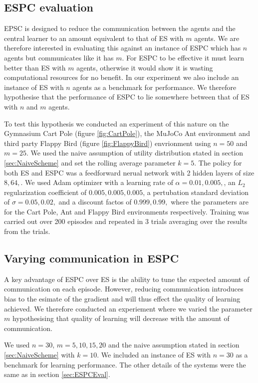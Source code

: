 \subsection{ESPC evaluation}
EPSC is designed to reduce the communication between the agents and the central learner to an amount equivalent to that of ES with $m$ agents. 
We are therefore interested in evaluating this against an instance of ESPC which has $n$ agents but communicates like it has $m$. 
For ESPC to be effective it must learn better than ES with $m$ agents, otherwise it would show it is wasting computational resources for no benefit. 
In our experiment we also include an instance of ES with $n$ agents as a benchmark for performance. 
We therefore hypothesise that the performance of ESPC to lie somewhere between that of ES with $n$ and $m$ agents.

To test this hypothesis we conducted an experiment of this nature on the Gymnasium Cart Pole (figure \ref{fig:CartPole}), the MuJoCo Ant environment and third party Flappy Bird (figure \ref{fig:FlappyBird}) envrionment using $n=50$ and $m=25$. We used the naive assumption of utility distribution stated in section \ref{sec:NaiveScheme} and set the rolling average parameter $k=5$. The policy for both ES and ESPC was a feedforward nerual network with 2 hidden layers of size $8,64,$. We used Adam optimizer \cite{Adam} with a learning rate of $\alpha=0.01,0.005,$, an $L_2$ regularization coefficient of $0.005,0.005,0.005$, a pertubation standard deviation of $\sigma=0.05,0.02,$ and a discount factos of $0.999,0.99,$ where the parameters are for the Cart Pole, Ant and Flappy Bird environments respectively. Training was carried out over 200 episodes and repeated in 3 trials averaging over the results from the trials.
\label{sec:ESPCEval}

\subsection{Varying communication in ESPC}
A key advantage of ESPC over ES is the ability to tune the expected amount of communication on each episode. However, reducing communication introduces bias to the esimate of the gradient and will thus effect the quality of learning achieved. We therefore conducted an experiement where we varied the parameter $m$ hypothesising that quality of learning will decrease with the amount of communication.

We used $n=30$, $m=5,10,15,20$ and the naive assumption stated in section \ref{sec:NaiveScheme} with $k=10$. We included an instance of ES with $n=30$ as a benchmark for learning performance. The other details of the systems were the same as in section \ref{sec:ESPCEval}.

